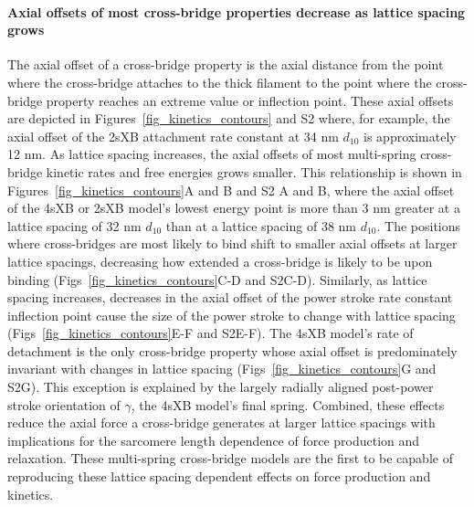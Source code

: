 \documentclass[10pt]{article}
\begin{document}
\paragraph{Axial offsets of most cross-bridge properties decrease as lattice spacing grows} %
The axial offset of a cross-bridge property is the axial distance from the point where the cross-bridge attaches to the thick filament to the point where the cross-bridge property reaches an extreme value or inflection point. 
These axial offsets are depicted in Figures~\ref{fig_kinetics_contours} and S2 where, for example, the axial offset of the 2sXB attachment rate constant at 34 nm $d_{10}$ is approximately 12 nm. 
As lattice spacing increases, the axial offsets of most multi-spring cross-bridge kinetic rates and free energies grows smaller.
This relationship is shown in Figures~\ref{fig_kinetics_contours}A and B and S2 A and B, where the axial offset of the 4sXB or 2sXB model's lowest energy point is more than 3 nm greater at a lattice spacing of 32 nm $d_{10}$ than at a lattice spacing of 38 nm $d_{10}$. 
The positions where cross-bridges are most likely to bind shift to smaller axial offsets at larger lattice spacings, decreasing how extended a cross-bridge is likely to be upon binding (Figs~\ref{fig_kinetics_contours}C-D and S2C-D). 
Similarly, as lattice spacing increases, decreases in the axial offset of the power stroke rate constant inflection point cause the size of the power stroke to change with lattice spacing (Figs~\ref{fig_kinetics_contours}E-F and S2E-F). %
The 4sXB model's rate of detachment is the only cross-bridge property whose axial offset is predominately invariant with changes in lattice spacing (Figs~\ref{fig_kinetics_contours}G and S2G). 
This exception is explained by the largely radially aligned post-power stroke orientation of $\gamma$, the 4sXB model's final spring. 
Combined, these effects reduce the axial force a cross-bridge generates at larger lattice spacings with implications for the sarcomere length dependence of force production and relaxation. 
These multi-spring cross-bridge models are the first to be capable of reproducing these lattice spacing dependent effects on force production and kinetics.
\end{document}
